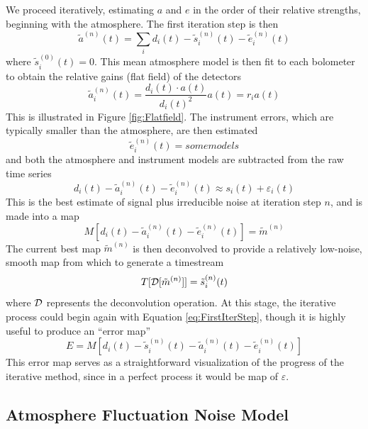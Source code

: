 \documentclass[12pt,preprint]{aastex}
\newcommand{\epsi}{\varepsilon}
\begin{document}
We proceed iteratively, estimating $a$ and $e$ in the order of their
relative strengths, beginning with the atmosphere.  The first
iteration step is then
\begin{equation}
\label{eq:FirstIterStep}
\tilde{a}^{(n)}(t) = 
\sum_i{d_i(t)-\tilde{s}^{(n)}_i(t) - \tilde{e}^{(n)}_i(t)}
\end{equation}
where $\tilde{s}^{(0)}_i(t)=0$.  This mean atmosphere model is then
fit to each bolometer to obtain the relative gains (flat field) of the
detectors
\begin{equation}
\tilde{a}^{(n)}_i(t) = \frac{d_i(t) \cdot a(t)}{d_i(t)^2} a(t) = r_i a(t)
\end{equation}
This is illustrated in Figure \ref{fig:Flatfield}.  The instrument
errors, which are typically smaller than the atmosphere, are then
estimated
\begin{equation}
\tilde{e}^{(n)}_i(t) = some models
\end{equation}
and both the atmosphere and instrument models are subtracted from the
raw time series
\begin{equation}
d_i(t) - \tilde{a}^{(n)}_i(t) - \tilde{e}^{(n)}_i(t)
\approx s_i(t) + \epsi_i(t)
\end{equation}
This is the best estimate of signal plus irreducible noise at
iteration step $n$, and is made into a map
\begin{equation}
M[d_i(t) - \tilde{a}^{(n)}_i(t) - \tilde{e}^{(n)}_i(t)] = \tilde{m}^{(n)}
\end{equation}
The current best map $\tilde{m}^{(n)}$ is then deconvolved to provide
a relatively low-noise, smooth map from which to generate a timestream
\begin{equation}
T[{\cal D}[\tilde{m}^{(n)}]] = \tilde{s}^{(n)}_i(t)
\end{equation}
where ${\cal D}$ represents the deconvolution operation.  At this
stage, the iterative process could begin again with Equation
\ref{eq:FirstIterStep}, though it is highly useful to produce an
``error map''
\begin{equation}
E = M[d_i(t) - \tilde{s}^{(n)}_i(t) - \tilde{a}^{(n)}_i(t) - 
\tilde{e}^{(n)}_i(t)]
\end{equation}
This error map serves as a straightforward visualization of the
progress of the iterative method, since in a perfect process it would
be map of $\epsi$.

\subsection{Atmosphere Fluctuation Noise Model}
\end{document}
